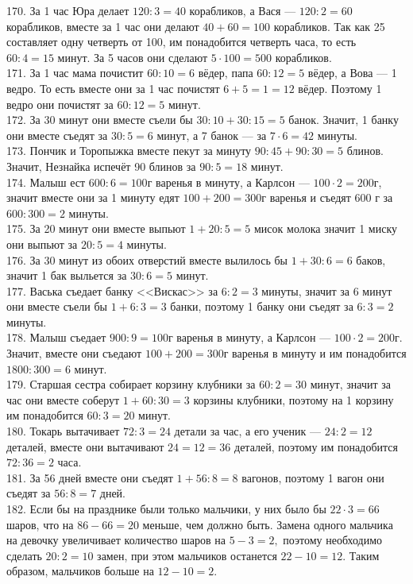 170. За 1 час Юра делает $120:3=40$ корабликов, а Вася --- $120:2=60$ корабликов, вместе за 1 час они делают $40+60=100$ корабликов. Так как 25 составляет одну четверть от 100, им понадобится четверть часа, то есть $60:4=15$ минут. За 5 часов они сделают $5\cdot100=500$ корабликов.\\
171. За 1 час мама почистит $60:10=6$ вёдер, папа $60:12=5$ вёдер, а Вова --- 1 ведро. То есть вместе они за 1 час почистят $6+5=1=12$ вёдер. Поэтому 1 ведро они почистят за $60:12=5$ минут.\\
172. За 30 минут они вместе съели бы $30:10+30:15=5$ банок. Значит, 1 банку они вместе съедят за $30:5=6$ минут, а 7 банок --- за $7\cdot6=42$ минуты.\\
173. Пончик и Торопыжка вместе пекут за минуту $90:45+90:30=5$ блинов. Значит, Незнайка испечёт 90 блинов за $90:5=18$ минут.\\
174. Малыш ест $600:6=100$г варенья в минуту, а Карлсон --- $100\cdot2=200$г, значит вместе они за 1 минуту едят $100+200=300$г варенья и съедят 600 г за $600:300=2$ минуты.\\
175. За 20 минут они вместе выпьют $1+20:5=5$ мисок молока значит 1 миску они выпьют за $20:5=4$ минуты.\\
176. За 30 минут из обоих отверстий вместе вылилось бы $1+30:6=6$ баков, значит 1 бак выльется за $30:6=5$ минут.\\
177. Васька съедает банку <<Вискас>> за $6:2=3$ минуты, значит за 6 минут они вместе съели бы $1+6:3=3$ банки, поэтому 1 банку они съедят за $6:3=2$ минуты.\\
178. Малыш съедает $900:9=100$г варенья в минуту, а Карлсон --- $100\cdot2=200$г. Значит, вместе они съедают $100+200=300$г варенья в минуту и им понадобится $1800:300=6$ минут.\\
179. Старшая сестра собирает корзину клубники за $60:2=30$ минут, значит за час они вместе соберут $1+60:30=3$ корзины клубники, поэтому на 1 корзину им понадобится $60:3=20$ минут.\\
180. Токарь вытачивает $72:3=24$ детали за час, а его ученик --- $24:2=12$ деталей, вместе они вытачивают $24=12=36$ деталей, поэтому им понадобится $72:36=2$ часа.\\
181. За 56 дней вместе они съедят $1+56:8=8$ вагонов, поэтому 1 вагон они съедят за $56:8=7$ дней.\\
182. Если бы на празднике были только мальчики, у них было бы $22\cdot3=66$ шаров, что на $86-66=20$ меньше, чем должно быть. Замена одного мальчика на девочку увеличивает количество шаров на $5-3=2,$ поэтому необходимо сделать $20:2=10$ замен, при этом мальчиков останется $22-10=12.$ Таким образом, мальчиков больше на $12-10=2.$\\

